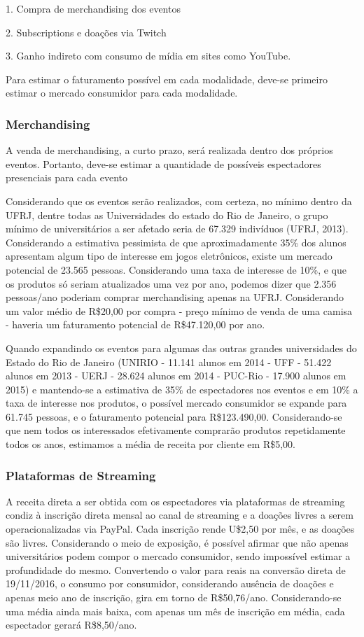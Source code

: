 \documentclass[a4paper, 12pt]{paper}
\begin{document}
1. Compra de merchandising dos eventos

2. Subscriptions e doações via Twitch

3. Ganho indireto com consumo de mídia em sites como YouTube.

Para estimar o faturamento possível em cada modalidade, deve-se primeiro estimar o mercado consumidor para cada modalidade.

\subsubsection{Merchandising}

A venda de merchandising, a curto prazo, será realizada dentro dos próprios eventos. Portanto, deve-se estimar a quantidade de possíveis espectadores presenciais para cada evento

Considerando que os eventos serão realizados, com certeza, no mínimo dentro da UFRJ, dentre todas as Universidades do estado do Rio de Janeiro, o grupo mínimo de universitários a ser afetado seria de 67.329 indivíduos (UFRJ, 2013). Considerando a estimativa pessimista de que aproximadamente 35\% dos alunos apresentam algum tipo de interesse em jogos eletrônicos, existe um mercado potencial de 23.565 pessoas. Considerando uma taxa de interesse de 10\%, e que os produtos só seriam atualizados uma vez por ano, podemos dizer que 2.356 pessoas/ano poderiam comprar merchandising apenas na UFRJ. Considerando um valor médio de R\$20,00 por compra - preço mínimo de venda de uma camisa - haveria um faturamento potencial de R\$47.120,00 por ano.

Quando expandindo os eventos para algumas das outras grandes universidades do Estado do Rio de Janeiro (UNIRIO - 11.141 alunos em 2014 - UFF - 51.422 alunos em 2013 - UERJ - 28.624 alunos em 2014 - PUC-Rio - 17.900 alunos em 2015) e mantendo-se a estimativa de 35\% de espectadores nos eventos e em 10\% a taxa de interesse nos produtos, o possível mercado consumidor se expande para 61.745 pessoas, e o faturamento potencial para R\$123.490,00. Considerando-se que nem todos os interessados efetivamente comprarão produtos repetidamente todos os anos, estimamos a média de receita por cliente em R\$5,00.

\subsubsection{Plataformas de Streaming}

A receita direta a ser obtida com os espectadores via plataformas de streaming condiz à inscrição direta mensal ao canal de streaming e a doações livres a serem operacionalizadas via PayPal. Cada inscrição rende U\$2,50 por mês, e as doações são livres. Considerando o meio de exposição, é possível afirmar que não apenas universitários podem compor o mercado consumidor, sendo impossível estimar a profundidade do mesmo. Convertendo o valor para reais na conversão direta de 19/11/2016, o consumo por consumidor, considerando ausência de doações e apenas meio ano de inscrição, gira em torno de R\$50,76/ano. Considerando-se uma média ainda mais baixa, com apenas um mês de inscrição em média, cada espectador gerará R\$8,50/ano.
\end{document}
